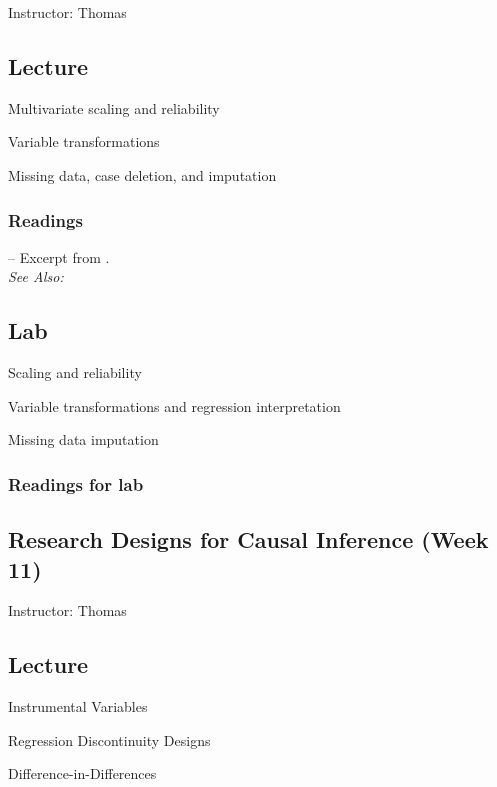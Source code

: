 \documentclass[11pt,a4paper]{article}
\newcommand{\reading}[2][]{\noindent -- {#1}\bibentry{#2}.\vspace{.25em}\\}
\newcommand{\thomas}{\vspace{1em}\noindent Instructor: Thomas\vspace{1em}\\}
\newcommand{\seealso}{\noindent \emph{See Also:}\\}
\begin{document}
\thomas

\subsection*{Lecture}
\begin{itemize*}
\item Multivariate scaling and reliability
\item Variable transformations
\item Missing data, case deletion, and imputation
\end{itemize*}

\subsubsection*{Readings}
\reading[Excerpt from ]{Lohr2009}

\seealso


\subsection*{Lab}

\begin{itemize*}
\item Scaling and reliability
\item Variable transformations and regression interpretation
\item Missing data imputation
\end{itemize*}

\subsubsection*{Readings for lab}



\clearpage
\subsection{Research Designs for Causal Inference (Week 11)}
\emph{}

\thomas

\subsection*{Lecture}
\begin{itemize*}
\item Instrumental Variables
\item Regression Discontinuity Designs
\item Difference-in-Differences
\end{itemize*}
\end{document}
